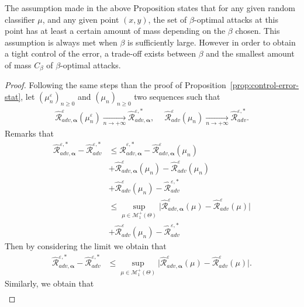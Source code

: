 The assumption made in the above Proposition states that for any given random classifier $\mu$, and any given point $(x,y)$, the set of $\beta$-optimal attacks at this point has at least a certain amount of mass depending on the $\beta$ chosen. This assumption is always met when $\beta$ is sufficiently large. However in order to obtain a tight control of the error, a trade-off exists between $\beta$ and the smallest amount of mass $C_{\beta}$ of $\beta$-optimal attacks.

\begin{proof}
Following the same steps than the proof of Proposition~\ref{prop:control-error-stat}, let $(\mu_n^{\varepsilon})_{n\geq 0}$ and $(\mu_n)_{n\geq 0}$ two sequences such that
\begin{align*}
    \widehat{\mathcal{R}}_{adv,\bm{\alpha}}^{\varepsilon}(\mu_n^{\varepsilon})\xrightarrow[n \to +\infty]{}\widehat{\mathcal{R}}_{adv,\bm{\alpha}}^{\varepsilon,*},~\quad \widehat{\mathcal{R}}_{adv}^{\varepsilon}(\mu_n)\xrightarrow[n \to +\infty]{}\widehat{\mathcal{R}}_{adv}^{\varepsilon,*}.
\end{align*}
Remarks that 
\begin{align*}
  \widehat{\mathcal{R}}_{adv,\bm{\alpha}}^{\varepsilon,*} - \widehat{\mathcal{R}}_{adv}^{\varepsilon,*}&\leq \widehat{\mathcal{R}}_{adv,\bm{\alpha}}^{\varepsilon,*} - \widehat{\mathcal{R}}_{adv,\bm{\alpha}}^{\varepsilon}(\mu_n)\\
  & + \widehat{\mathcal{R}}_{adv,\bm{\alpha}}^{\varepsilon}(\mu_n) -   \widehat{\mathcal{R}}_{adv}^{\varepsilon}(\mu_n)\\
  &+ \widehat{\mathcal{R}}_{adv}^{\varepsilon}(\mu_n)-\widehat{\mathcal{R}}_{adv}^{\varepsilon,*}\\
  &\leq \sup_{\mu\in\mathcal{M}_1^{+}(\Theta)}\Big|\widehat{\mathcal{R}}_{adv,\bm{\alpha}}^{\varepsilon}(\mu) -   \widehat{\mathcal{R}}_{adv}^{\varepsilon}(\mu)  \Big|\\
  & + \widehat{\mathcal{R}}_{adv}^{\varepsilon}(\mu_n)-\widehat{\mathcal{R}}_{adv}^{\varepsilon,*}
\end{align*}
Then by considering the limit we obtain that 
\begin{align*}
    \widehat{\mathcal{R}}_{adv,\bm{\alpha}}^{\varepsilon,*} - \widehat{\mathcal{R}}_{adv}^{\varepsilon,*}&\leq \sup_{\mu\in\mathcal{M}_1^{+}(\Theta)}\Big|\widehat{\mathcal{R}}_{adv,\bm{\alpha}}^{\varepsilon}(\mu) -   \widehat{\mathcal{R}}_{adv}^{\varepsilon}(\mu)  \Big|.
\end{align*}
Similarly, we obtain that 
\begin{align*}

\end{align*}
\end{proof}
